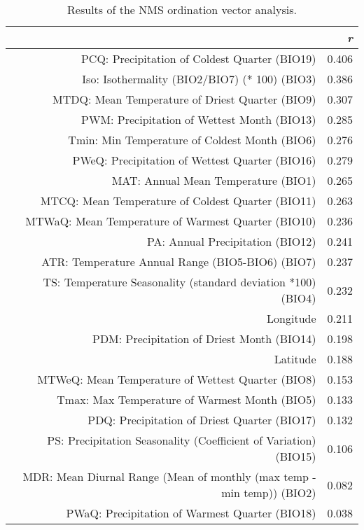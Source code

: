 \begin{table}[ht]
\centering
\begin{tabular}{rr}
  \hline
 & {\emph{r}} \\ 
  \hline
PCQ: Precipitation of Coldest Quarter (BIO19) & 0.406 \\ 
  Iso: Isothermality (BIO2/BIO7) (* 100) (BIO3) & 0.386 \\ 
  MTDQ: Mean Temperature of Driest Quarter (BIO9) & 0.307 \\ 
  PWM: Precipitation of Wettest Month (BIO13) & 0.285 \\ 
  Tmin: Min Temperature of Coldest Month (BIO6) & 0.276 \\ 
  PWeQ: Precipitation of Wettest Quarter (BIO16) & 0.279 \\ 
  MAT: Annual Mean Temperature (BIO1) & 0.265 \\ 
  MTCQ: Mean Temperature of Coldest Quarter (BIO11) & 0.263 \\ 
  MTWaQ: Mean Temperature of Warmest Quarter (BIO10) & 0.236 \\ 
  PA: Annual Precipitation (BIO12) & 0.241 \\ 
  ATR: Temperature Annual Range (BIO5-BIO6) (BIO7) & 0.237 \\ 
  TS: Temperature Seasonality (standard deviation *100) (BIO4) & 0.232 \\ 
  Longitude & 0.211 \\ 
  PDM: Precipitation of Driest Month (BIO14) & 0.198 \\ 
  Latitude & 0.188 \\ 
  MTWeQ: Mean Temperature of Wettest Quarter (BIO8) & 0.153 \\ 
  Tmax: Max Temperature of Warmest Month (BIO5) & 0.133 \\ 
  PDQ: Precipitation of Driest Quarter (BIO17) & 0.132 \\ 
  PS: Precipitation Seasonality (Coefficient of Variation) (BIO15) & 0.106 \\ 
  MDR: Mean Diurnal Range (Mean of monthly (max temp - min temp)) (BIO2) & 0.082 \\ 
  PWaQ: Precipitation of Warmest Quarter (BIO18) & 0.038 \\ 
   \hline
\end{tabular}
\caption{Results of the NMS ordination vector analysis.} 
\label{tab:wc_vec}
\end{table}
